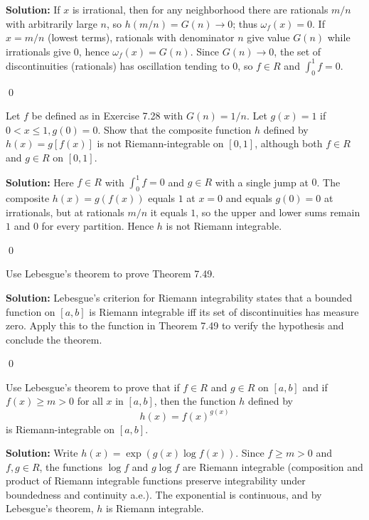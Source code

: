 \noindent\textbf{Solution:}
If $x$ is irrational, then for any neighborhood there are rationals $m/n$ with arbitrarily large $n$, so $h(m/n)=G(n)\to 0$; thus $\omega_f(x)=0$. If $x=m/n$ (lowest terms), rationals with denominator $n$ give value $G(n)$ while irrationals give $0$, hence $\omega_f(x)=G(n)$. Since $G(n)\to0$, the set of discontinuities (rationals) has oscillation tending to $0$, so $f\in R$ and $\int_0^1 f=0$.




\qed
\begin{problembox}
Let $f$ be defined as in Exercise 7.28 with $G(n) = 1/n$. Let $g(x) = 1$ if $0 < x \leq 1, g(0) = 0$. Show that the composite function $h$ defined by $h(x) = g[f(x)]$ is not Riemann-integrable on $[0, 1]$, although both $f \in R$ and $g \in R$ on $[0, 1]$.
\end{problembox}

\noindent\textbf{Solution:}
Here $f\in R$ with $\int_0^1 f=0$ and $g\in R$ with a single jump at $0$. The composite $h(x)=g(f(x))$ equals $1$ at $x=0$ and equals $g(0)=0$ at irrationals, but at rationals $m/n$ it equals $1$, so the upper and lower sums remain $1$ and $0$ for every partition. Hence $h$ is not Riemann integrable.




\qed
\begin{problembox}
Use Lebesgue's theorem to prove Theorem 7.49.
\end{problembox}

\noindent\textbf{Solution:}
Lebesgue's criterion for Riemann integrability states that a bounded function on $[a,b]$ is Riemann integrable iff its set of discontinuities has measure zero. Apply this to the function in Theorem 7.49 to verify the hypothesis and conclude the theorem.




\qed
\begin{problembox}
Use Lebesgue's theorem to prove that if $f \in R$ and $g \in R$ on $[a, b]$ and if $f(x) \geq m > 0$ for all $x$ in $[a, b]$, then the function $h$ defined by
\[h(x) = f(x)^{g(x)}\]
is Riemann-integrable on $[a, b]$.
\end{problembox}

\noindent\textbf{Solution:}
Write $h(x)=\exp(g(x)\log f(x))$. Since $f\ge m>0$ and $f,g\in R$, the functions $\log f$ and $g\log f$ are Riemann integrable (composition and product of Riemann integrable functions preserve integrability under boundedness and continuity a.e.). The exponential is continuous, and by Lebesgue's theorem, $h$ is Riemann integrable.




